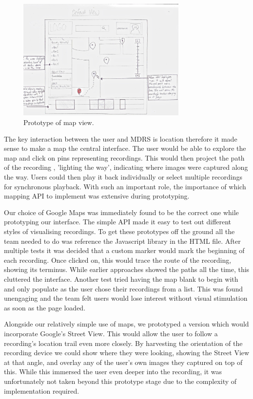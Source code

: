 \documentclass{l3proj}
\begin{document}
\begin{figure}[ht!]
\centering
\includegraphics[width=0.75\textwidth]{images/web-map-view.jpg}
\caption{Prototype of map view.}
\end{figure}

The key interaction between the user and MDRS is location therefore it made sense to make a map the central interface. The user would be able to explore the map and click on pins representing recordings. This would then project the path of the recording , 'lighting the way', indicating where images were captured along the way. Users could then play it back individually or select multiple recordings for synchronous playback. With such an important role, the importance of which mapping API to implement was extensive during prototyping.

Our choice of Google Maps was immediately found to be the correct one while prototyping our interface. The simple API made it easy to test out different styles of visualising recordings. To get these prototypes off the ground all the team needed to do was  reference the Javascript library in the HTML file. After multiple tests it was decided that a custom marker would mark the beginning of each recording. Once clicked on, this would trace the route of the recording, showing its terminus. While earlier approaches showed the paths all the time, this cluttered the interface. Another test tried having the map blank to begin with and only populate as the user chose their recordings from a list. This was found unengaging and the team felt users would lose interest without visual stimulation as soon as the page loaded.

Alongside our relatively simple use of maps, we prototyped a version which would incorporate Google's Street View. This would allow the user to follow a recording's location trail even more closely. By harvesting the orientation of the recording device we could show where they were looking, showing the Street View at that angle, and overlay any of the user's own images they captured on top of this. While this immersed the user even deeper into the recording, it was unfortunately not taken beyond this prototype stage due to the complexity of implementation required.
\end{document}
